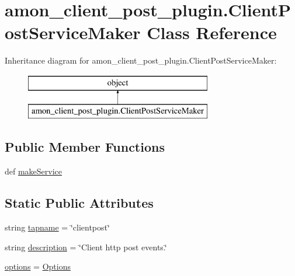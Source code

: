 \hypertarget{classamon__client__post__plugin_1_1_client_post_service_maker}{\section{amon\-\_\-client\-\_\-post\-\_\-plugin.\-Client\-Post\-Service\-Maker Class Reference}
\label{classamon__client__post__plugin_1_1_client_post_service_maker}
}
Inheritance diagram for amon\-\_\-client\-\_\-post\-\_\-plugin.\-Client\-Post\-Service\-Maker\-:\begin{figure}[H]
\begin{center}
\leavevmode
\includegraphics[height=2.000000cm]{d6/d08/classamon__client__post__plugin_1_1_client_post_service_maker}
\end{center}
\end{figure}
\subsection*{Public Member Functions}
\begin{DoxyCompactItemize}
\item 
def \hyperlink{classamon__client__post__plugin_1_1_client_post_service_maker_aa80a4a64acaf47b4676b3d13adc7f084}{make\-Service}
\end{DoxyCompactItemize}
\subsection*{Static Public Attributes}
\begin{DoxyCompactItemize}
\item 
string \hyperlink{classamon__client__post__plugin_1_1_client_post_service_maker_ae6514d6e442e3e0855d2e474d3ec09a5}{tapname} = \char`\"{}clientpost\char`\"{}
\item 
string \hyperlink{classamon__client__post__plugin_1_1_client_post_service_maker_ac1d97b2b87e84d746bff8f68179b443a}{description} = \char`\"{}Client http post events.\char`\"{}
\item 
\hyperlink{classamon__client__post__plugin_1_1_client_post_service_maker_a24da49904f7a79f0d43139c68228d96d}{options} = \hyperlink{classamon__client__post__plugin_1_1_options}{Options}
\end{DoxyCompactItemize}


